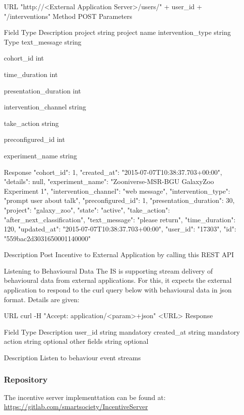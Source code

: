 URL
"http://<External Application Server>/users/" + user_id + "/interventions"
Method
POST
Parameters

Field
Type
Description
project
string
project name
intervention_type
string
Type
text_message
string


cohort_id
int


time_duration
int


presentation_duration
int


intervention_channel
string


take_action
string


preconfigured_id
int


experiment_name
string




Response
{
    "cohort_id": 1,
    "created_at": "2015-07-07T10:38:37.703+00:00",
    "details": null,
    "experiment_name": "Zooniverse-MSR-BGU GalaxyZoo Experiment 1",
    "intervention_channel": "web message",
    "intervention_type": "prompt user about talk",
    "preconfigured_id": 1,
    "presentation_duration": 30,
    "project": "galaxy_zoo",
    "state": "active",
    "take_action": "after_next_classification",
    "text_message": "please return",
    "time_duration": 120,
    "updated_at": "2015-07-07T10:38:37.703+00:00",
    "user_id": "17303",
    "id": "559bac2d3031650001140000"
}


Description
Post Incentive to  External Application by calling this REST API 


Listening to Behavioural Data 
The IS is supporting stream delivery of behavioural data from external applications.  For this, it expects the external application to respond to the curl query below with behavioural data in json format. Details are given: 

URL
curl -H "Accept: application/<param>+json" <URL>
Response

Field
Type
Description
user_id
string
mandatory
created_at
string
mandatory
action
string
optional
other fields
string
optional


Description
Listen to behaviour event streams 


\subsubsection{Repository}
The incentive server implementtation can be found at: \url{https://gitlab.com/smartsociety/IncentiveServer}